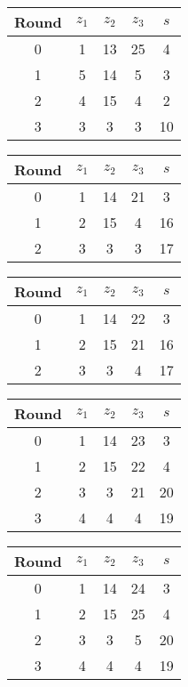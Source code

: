 \begin{table}
\begin{tabular}{c | c | c | c | c }
Round & $z_1$ & $z_2$ & $z_3$ & $s$ \\
\hline
0 & 1 & 13 & 25 & 4 \\
1 & 5 & 14 & 5 & 3 \\
2 & 4 & 15 & 4 & 2 \\
3 & 3 & 3 & 3 & 10
\end{tabular}
\end{table}

\begin{table}
\begin{tabular}{c | c | c | c | c }
Round & $z_1$ & $z_2$ & $z_3$ & $s$ \\
\hline
0 & 1 & 14 & 21 & 3 \\
1 & 2 & 15 & 4 & 16 \\
2 & 3 & 3 & 3 & 17
\end{tabular}
\end{table}

\begin{table}
\begin{tabular}{c | c | c | c | c }
Round & $z_1$ & $z_2$ & $z_3$ & $s$ \\
\hline
0 & 1 & 14 & 22 & 3 \\
1 & 2 & 15 & 21 & 16 \\
2 & 3 & 3 & 4 & 17
\end{tabular}
\end{table}

\begin{table}
\begin{tabular}{c | c | c | c | c }
Round & $z_1$ & $z_2$ & $z_3$ & $s$ \\
\hline
0 & 1 & 14 & 23 & 3 \\
1 & 2 & 15 & 22 & 4 \\
2 & 3 & 3 & 21 & 20 \\
3 & 4 & 4 & 4 & 19
\end{tabular}
\end{table}

\begin{table}
\begin{tabular}{c | c | c | c | c }
Round & $z_1$ & $z_2$ & $z_3$ & $s$ \\
\hline
0 & 1 & 14 & 24 & 3 \\
1 & 2 & 15 & 25 & 4 \\
2 & 3 & 3 & 5 & 20 \\
3 & 4 & 4 & 4 & 19
\end{tabular}
\end{table}

